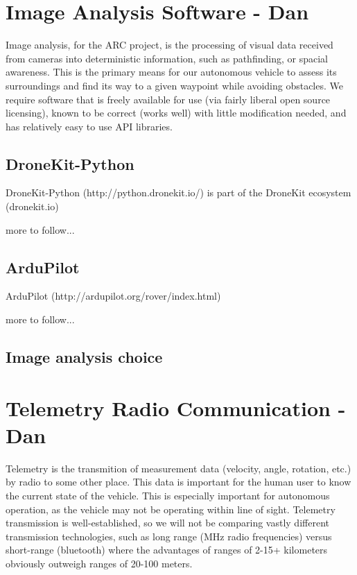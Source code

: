 \documentclass[compsoc,draftclsnofoot,onecolumn,10pt]{IEEEtran}
\begin{document}
\section{Image Analysis Software - Dan}
Image analysis, for the ARC project, is the processing of visual data received
from cameras into deterministic information, such as pathfinding, or spacial
awareness. This is the primary means for our autonomous vehicle to assess its
surroundings and find its way to a given waypoint while avoiding obstacles. We
require software that is freely available for use (via fairly liberal open
source licensing), known to be correct (works well) with little modification
needed, and has relatively easy to use API libraries.

\subsection{DroneKit-Python}
DroneKit-Python (http://python.dronekit.io/) is part of the DroneKit ecosystem (dronekit.io)\par
more to follow...

\subsection{ArduPilot}
ArduPilot (http://ardupilot.org/rover/index.html)\par
more to follow...

\subsection{Image analysis choice}

\section{Telemetry Radio Communication - Dan}
Telemetry is the transmition of measurement data (velocity, angle, rotation, etc.)
by radio to some other place. This data is important for the human user to
know the current state of the vehicle. This is especially important for
autonomous operation, as the vehicle may not be operating within line of
sight. Telemetry transmission is well-established, so we will not be comparing
vastly different transmission technologies, such as long range (MHz radio frequencies)
versus short-range (bluetooth) where the advantages of ranges of 2-15+
kilometers obviously outweigh ranges of 20-100 meters.
\end{document}

